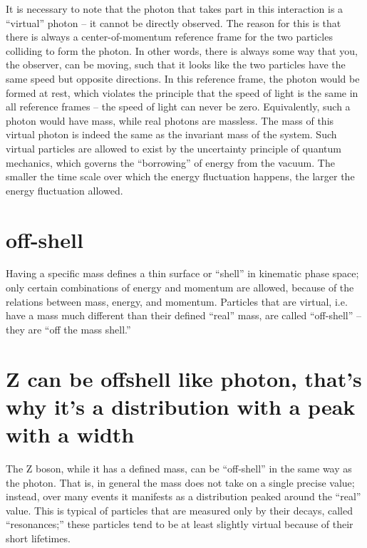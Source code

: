 It is necessary to note that the photon that takes 
part in this interaction is a ``virtual'' photon -- 
it cannot be directly observed.  
The reason for this is that there is always a 
center-of-momentum reference 
frame for the two particles colliding to form the photon.  
In other words, there is always some way that you, 
the observer, can be moving, 
such that it looks like the two particles 
have the same speed but opposite directions.  
In this reference frame, the photon would be formed at rest, 
which violates the principle that the speed of light 
is the same in all reference frames -- 
the speed of light can never be zero.  
Equivalently, such a photon would have mass, 
while real photons are massless.  
The mass of this virtual photon is indeed the same 
as the invariant mass of the system.  
Such virtual particles are allowed to exist 
by the uncertainty principle of quantum mechanics, 
which governs the ``borrowing'' of energy from the vacuum.  
The smaller the time scale over which the energy 
fluctuation happens, 
the larger the energy fluctuation allowed.  
\section{off-shell}
Having a specific mass defines a thin 
surface or ``shell'' in kinematic phase space; 
only certain combinations of energy and momentum 
are allowed, 
because of the relations between mass, energy, and momentum.  
Particles that are virtual, 
i.e. have a mass much different than their 
defined ``real'' mass, 
are called ``off-shell'' -- 
they are ``off the mass shell.''  
\section{Z can be offshell like photon, that's why it's a distribution with a peak with a width}
The Z boson, while it has a defined mass, 
can be ``off-shell'' in the same way as the photon.  
That is, in general the 
mass 
does not take on a single precise value; 
instead, over many events it manifests as a distribution 
peaked around the ``real'' value.  
This is typical of particles that are measured only 
by their decays, called ``resonances;'' 
these particles tend to be at least slightly virtual 
because of their short lifetimes.  
